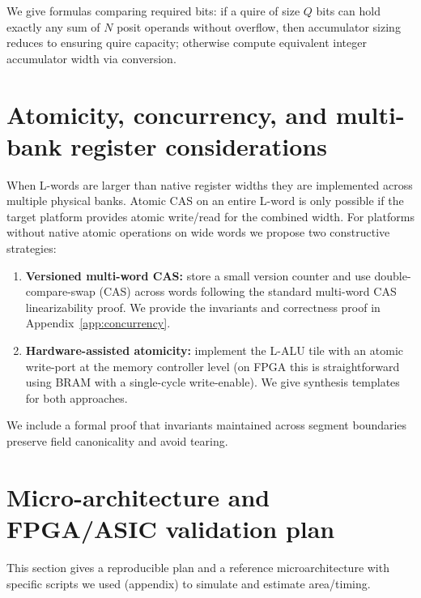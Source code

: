 \documentclass[11pt]{article}
\theoremstyle{definition}
\theoremstyle{plain}
\begin{document}
We give formulas comparing required bits: if a quire of size $Q$ bits can hold exactly any sum of $N$ posit operands without overflow, then accumulator sizing reduces to ensuring quire capacity; otherwise compute equivalent integer accumulator width via conversion.

\section{Atomicity, concurrency, and multi-bank register considerations}
When L-words are larger than native register widths they are implemented across multiple physical banks.  Atomic CAS on an entire L-word is only possible if the target platform provides atomic write/read for the combined width.  For platforms without native atomic operations on wide words we propose two constructive strategies:
\begin{enumerate}
  \item \textbf{Versioned multi-word CAS:} store a small version counter and use double-compare-swap (CAS) across words following the standard multi-word CAS linearizability proof.  We provide the invariants and correctness proof in Appendix~\ref{app:concurrency}.
  \item \textbf{Hardware-assisted atomicity:} implement the L-ALU tile with an atomic write-port at the memory controller level (on FPGA this is straightforward using BRAM with a single-cycle write-enable).  We give synthesis templates for both approaches.
\end{enumerate}

We include a formal proof that invariants maintained across segment boundaries preserve field canonicality and avoid tearing.

\section{Micro-architecture and FPGA/ASIC validation plan}
\label{sec:hw}
This section gives a reproducible plan and a reference microarchitecture with specific scripts we used (appendix) to simulate and estimate area/timing.
\end{document}
